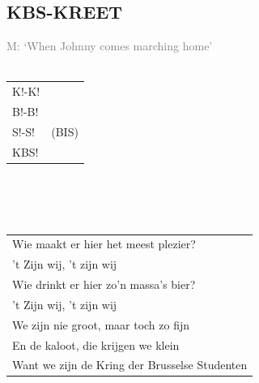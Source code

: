 \documentclass{article}
\begin{document}
\subsection*{KBS-KREET}
\textcolor{gray}{M: ‘When Johnny comes marching home’}
\\\\
\begin{tabularx}{0.8\textwidth}{>{\raggedright\arraybackslash}X | c}
    K!-K! &  \\
    B!-B! &  \\
    S!-S!  &  (BIS) \\
    KBS! &   \\
\end{tabularx}
\\\\\\
\begin{tabularx}{0.8\textwidth}{>{\raggedright\arraybackslash}X}
Wie maakt er hier het meest plezier? \\
’t Zijn wij, ’t zijn wij\\
Wie drinkt er hier zo’n massa’s bier?\\
’t Zijn wij, ’t zijn wij\\
We zijn nie groot, maar toch zo fijn\\
En de kaloot, die krijgen we klein\\
Want we zijn de Kring der Brusselse Studenten\\
\end{tabularx}
\end{document}
